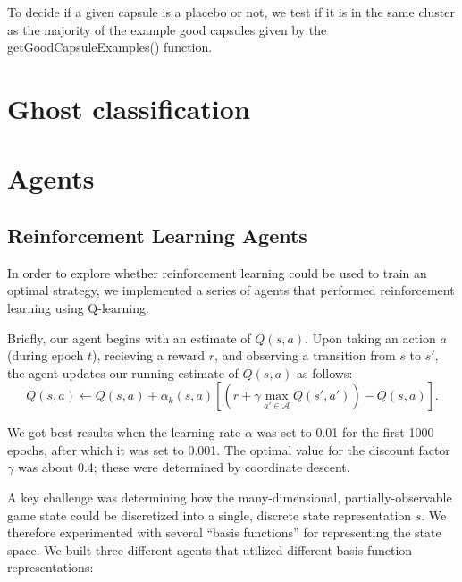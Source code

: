 \documentclass[11pt]{amsart}
\begin{document}
To decide if a given capsule is a placebo or not, we test if it is in the same cluster as the majority of the example good capsules given by the getGoodCapsuleExamples() function.

\section{Ghost classification}

\section{Agents}

\subsection{Reinforcement Learning Agents}

In order to explore whether reinforcement learning could be used to train an optimal strategy, we implemented a series of agents that performed reinforcement learning using Q-learning.

Briefly, our agent begins with an estimate of $Q(s,a)$. Upon taking an action $a$ (during epoch $t$), recieving a reward $r$, and observing a transition from $s$
to $s'$, the agent updates our running estimate of $Q(s,a)$ as follows:
$$Q(s,a) \gets Q(s,a) + \alpha_k(s,a) \left[ (r + \gamma \max_{a' \in \mathcal{A}} Q(s', a')) - Q(s,a) \right].$$

We got best results when the learning rate $\alpha$ was set to 0.01 for the first 1000 epochs, after which it was set to 0.001. The optimal value for the discount factor $\gamma$ was about 0.4; these were determined by coordinate descent. 

A key challenge was determining how the many-dimensional, partially-observable game state could be discretized into a single, discrete state representation $s$. We therefore experimented with several ``basis functions'' for representing the state space. We built three different agents that utilized different basis function representations:
\end{document}
